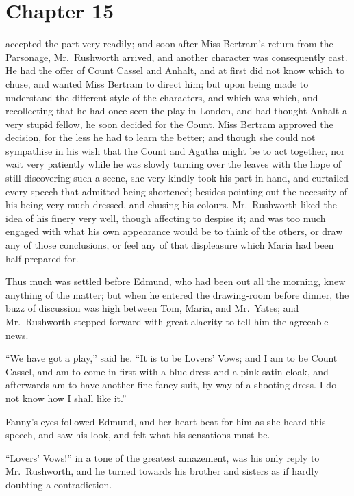 \chapter{Chapter 15}

 accepted the part very readily; and soon after
Miss Bertram's return from the Parsonage, Mr.\ Rushworth
arrived, and another character was consequently cast.
He had the offer of Count Cassel and Anhalt, and at first
did not know which to chuse, and wanted Miss Bertram
to direct him; but upon being made to understand the
different style of the characters, and which was which,
and recollecting that he had once seen the play in London,
and had thought Anhalt a very stupid fellow, he soon
decided for the Count.  Miss Bertram approved the decision,
for the less he had to learn the better; and though she
could not sympathise in his wish that the Count and
Agatha might be to act together, nor wait very patiently
while he was slowly turning over the leaves with the hope
of still discovering such a scene, she very kindly took
his part in hand, and curtailed every speech that admitted
being shortened; besides pointing out the necessity
of his being very much dressed, and chusing his colours.
Mr.\ Rushworth liked the idea of his finery very well,
though affecting to despise it; and was too much
engaged with what his own appearance would be to think
of the others, or draw any of those conclusions, or feel
any of that displeasure which Maria had been half prepared for.

Thus much was settled before Edmund, who had been out all
the morning, knew anything of the matter; but when he
entered the drawing-room before dinner, the buzz of
discussion was high between Tom, Maria, and Mr.\ Yates;
and Mr.\ Rushworth stepped forward with great alacrity
to tell him the agreeable news.

``We have got a play,'' said he.  ``It is to be Lovers'
Vows; and I am to be Count Cassel, and am to come
in first with a blue dress and a pink satin cloak,
and afterwards am to have another fine fancy suit,
by way of a shooting-dress. I do not know how I shall like it.''

Fanny's eyes followed Edmund, and her heart beat for him
as she heard this speech, and saw his look, and felt
what his sensations must be.

``Lovers' Vows!'' in a tone of the greatest amazement,
was his only reply to Mr.\ Rushworth, and he turned
towards his brother and sisters as if hardly doubting
a contradiction.

